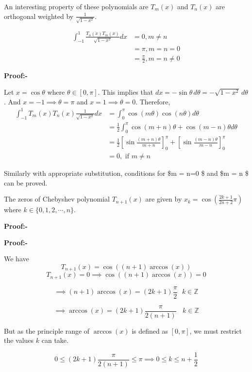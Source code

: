 \documentclass[
]{book}
\begin{document}
An interesting property of these polynomials are \(T_m(x)\) and \(T_n(x)\) are orthogonal weighted by \(\frac{1}{\sqrt{1-x^2}}\).

\begin{align}
   \int_{-1}^{1}\frac{ T_n(x)T_m(x)}{\sqrt{1-x^2}}dx &= 0 , m \neq n\\
                                    &= \pi,m = n= 0\\
                                    &= \frac{\pi}{2}, m = n \neq 0               
\end{align}

\textbf{Proof:-}

Let \(x = \cos \theta\) where \(\theta \in [0,\pi]\). This implies that \(dx = -\sin \theta \, d \theta = -\sqrt{1-x^2} \, d \theta\). And \(x=-1 \implies \theta = \pi\) and \(x =1 \implies \theta = 0\). Therefore,
\begin{align*}
\int_{-1}^{1} T_m(x)T_n(x) \frac{1}{\sqrt{1-x^2}} dx & = \int_{0}^{\pi} \cos(m\theta) \cos(n\theta) d\theta \\
&= \frac{1}{2}{\int_{0}^{\pi}} \cos(m+n)\theta 
+ \cos(m-n)\theta d\theta  \\
&=\frac{1}{2} \left[\sin\frac{(m+n)\theta }{m+n}\right]_{0}^{\pi}
+ \left[\sin\frac{(m-n)\theta }{m-n}\right]_{0}^{\pi}\\
&= 0, \text{ if } m \neq n 
\end{align*}

Similarly with appropriate substitution, conditions for \$m = n=0 \$ and \$m = n  \$ can be proved.

The zeros of Chebyshev polynomial \(T_{n+1}(x)\) are given by \(x_k = \cos\left( \frac{2k+1}{2n+2} \pi \right)\) where \(k \in \{ 0,1,2,\cdots,n \}\).

\textbf{Proof:-}

\begin{flushleft}
\textbf{Proof:-}
\end{flushleft}

We have \[T_{n+1}(x) = \cos((n+1)\arccos(x))\]
\[T_{n+1}(x) = 0 \implies \cos((n+1)\arccos(x)) = 0\]

\[\implies(n+1) \arccos(x) = (2k+1)\frac{\pi}{2} \ \ \ k \in \mathbb{Z}\]

\[\implies \arccos(x) = (2k+1)\frac{\pi}{2(n+1)} \ \ \ \ k \in \mathbb{Z}\]

But as the principle range of \(\arccos(x)\) is defined as \([0,\pi]\), we must restrict the values \(k\) can take.

\[0 \le (2k+1)\frac{\pi}{2(n+1)} \le \pi \implies 0 \le k \le n+\frac{1}{2} \]
\end{document}
